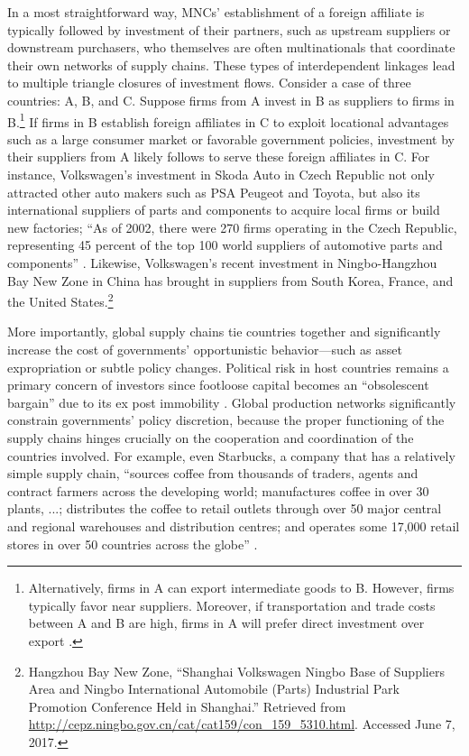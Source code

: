 \documentclass[reqno,onecolumn,letterpaper,12pt]{article}
\begin{document}
In a most straightforward way, MNCs' establishment of a foreign affiliate is typically followed by investment of their partners, such as upstream suppliers or downstream purchasers, who themselves are often multinationals that coordinate their own networks of supply chains. These types of interdependent linkages lead to multiple triangle closures of investment flows. Consider a case of three countries: A, B, and C. Suppose firms from A invest in B as suppliers to firms in B.\footnote{Alternatively, firms in A can export intermediate goods to B. However, firms typically favor near suppliers. Moreover, if transportation and trade costs between A and B are high, firms in A will prefer direct investment over export \citep{Carr_et_al:2001}. } If firms in B establish foreign affiliates in C to exploit locational advantages such as a large consumer market or favorable government policies, investment by their suppliers from A likely follows to serve these foreign affiliates in C. For instance, Volkswagen's investment in Skoda Auto in Czech Republic not only attracted other auto makers such as PSA Peugeot and Toyota, but also its international suppliers of parts and components to acquire local firms or build new factories; ``As of 2002, there were 270 firms operating in the Czech Republic, representing 45 percent of the top 100 world suppliers of automotive parts and components'' \citep[352]{Kaminski_Javorcik:2005}. Likewise, Volkswagen's recent investment in Ningbo-Hangzhou Bay New Zone in China has brought in suppliers from South Korea, France, and the United States.\footnote{Hangzhou Bay New Zone, ``Shanghai Volkswagen Ningbo Base of Suppliers Area and Ningbo International Automobile (Parts) Industrial Park Promotion Conference Held in Shanghai.'' Retrieved from \url{http://cepz.ningbo.gov.cn/cat/cat159/con_159_5310.html}. Accessed June 7, 2017.}

More importantly, global supply chains tie countries together and significantly increase the cost of governments' opportunistic behavior---such as asset expropriation or subtle policy changes. Political risk in host countries remains a primary concern of investors since footloose capital becomes an ``obsolescent bargain'' due to its ex post immobility \citep{Vernon:1971,Vernon:1980}. Global production networks significantly constrain governments' policy discretion, because the proper functioning of the supply chains hinges crucially on the cooperation and coordination of the countries involved. For example, even Starbucks, a company that has a relatively simple supply chain, ``sources coffee from thousands of traders, agents and contract farmers across the developing world; manufactures coffee in over 30 plants, ...; distributes the coffee to retail outlets through over 50 major central and regional warehouses and distribution centres; and operates some 17,000 retail stores in over 50 countries across the globe'' \citep[142]{UNCTAD:2013}.
\end{document}
